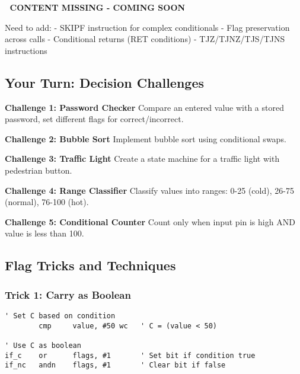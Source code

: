 \documentclass[11pt]{book}
\begin{document}
\begin{missing}
🚧 \textbf{CONTENT MISSING - COMING SOON}

Need to add:
- SKIPF instruction for complex conditionals
- Flag preservation across calls
- Conditional returns (RET conditions)
- TJZ/TJNZ/TJS/TJNS instructions
\end{missing}

\hypertarget{your-turn-decision-challenges}{%
\subsection{Your Turn: Decision
Challenges}\label{your-turn-decision-challenges}}

\begin{yourturn}
\textbf{Challenge 1: Password Checker}
Compare an entered value with a stored password, set different flags for correct/incorrect.

\textbf{Challenge 2: Bubble Sort}
Implement bubble sort using conditional swaps.

\textbf{Challenge 3: Traffic Light}
Create a state machine for a traffic light with pedestrian button.

\textbf{Challenge 4: Range Classifier}
Classify values into ranges: 0-25 (cold), 26-75 (normal), 76-100 (hot).

\textbf{Challenge 5: Conditional Counter}
Count only when input pin is high AND value is less than 100.
\end{yourturn}

\hypertarget{flag-tricks-and-techniques}{%
\subsection{Flag Tricks and
Techniques}\label{flag-tricks-and-techniques}}

\hypertarget{trick-1-carry-as-boolean}{%
\subsubsection{Trick 1: Carry as
Boolean}\label{trick-1-carry-as-boolean}}

\begin{lstlisting}
' Set C based on condition
        cmp     value, #50 wc   ' C = (value < 50)
        
' Use C as boolean
if_c    or      flags, #1       ' Set bit if condition true
if_nc   andn    flags, #1       ' Clear bit if false
\end{lstlisting}
\end{document}
